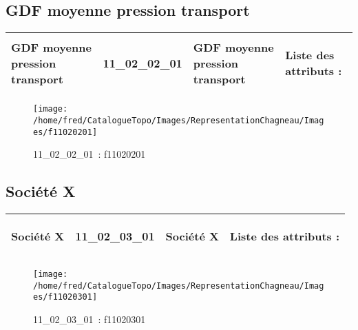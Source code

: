 \documentclass[12pt,titlepage]{book}
\begin{document}
\subsection{GDF moyenne pression transport}
\noindent
\vspace{\baselineskip}

\renewcommand{\arraystretch}{1.2}
\begin{supertabular}{|p{10cm}|c|p{13cm}|p{12cm}|}
 GDF moyenne pression transport & 11\_02\_02\_01 & GDF moyenne pression transport & Liste des attributs :
\begin{enumerate}
\end{enumerate}
\\
\hline
\end{supertabular}
\begin{figure}[h!]
  \hfill         %
  \begin{minipage}[t]{3cm}
    \begin{center}
      \texttt{[image: /home/fred/CatalogueTopo/Images/RepresentationChagneau/Images/f11020201]}
      \caption[~11\_02\_02\_01]{\small{11\_02\_02\_01~:} \tiny{f11020201}}\label{f11020201}
    \end{center}
  \end{minipage}
\end{figure}


\subsection{Société X}
\noindent
\vspace{\baselineskip}

\renewcommand{\arraystretch}{1.2}
\begin{supertabular}{|p{10cm}|c|p{13cm}|p{12cm}|}
 Société X & 11\_02\_03\_01 & Société X & Liste des attributs :
\begin{enumerate}
\end{enumerate}
\\
\hline
\end{supertabular}
\begin{figure}[h!]
  \hfill         %
  \begin{minipage}[t]{3cm}
    \begin{center}
      \texttt{[image: /home/fred/CatalogueTopo/Images/RepresentationChagneau/Images/f11020301]}
      \caption[~11\_02\_03\_01]{\small{11\_02\_03\_01~:} \tiny{f11020301}}\label{f11020301}
    \end{center}
  \end{minipage}
\end{figure}
\end{document}
